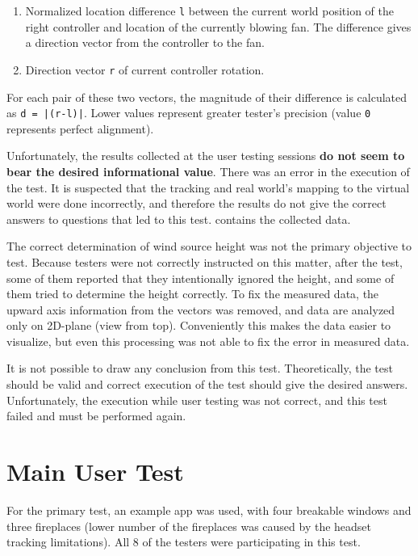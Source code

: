 \begin{enumerate}

\item{Normalized location difference \texttt{l} between the current world position of the right
controller and location of the currently blowing fan. The difference gives a direction
vector from the controller to the fan.}

\item{Direction vector \texttt{r} of current controller rotation.}

\end{enumerate}


For each pair of these two vectors, the magnitude of their difference is calculated
as \texttt{d = |(r-l)|}.
Lower values represent greater tester’s precision (value \texttt{0} represents
perfect alignment).



Unfortunately, the results collected at the user testing sessions
\textbf{do not seem to bear the desired informational value}.
There was an error in the execution of the test. It is suspected that
the tracking and real world’s mapping to the virtual world were done
incorrectly, and therefore the results do not give the correct answers to
questions that led to this test. \hyperlink{15-attachments#att2}{}
contains the collected data.


The correct determination of wind source height was not the primary
objective to test. Because testers were not correctly instructed on this matter,
after the test, some of them reported that they intentionally ignored the
height, and some of them tried to determine the height correctly.
To fix the measured data, the upward axis information from the vectors was
removed, and data are analyzed only on 2D-plane (view from top).
Conveniently this makes the data easier to visualize, but even this
processing was not able to fix the error in measured data.


It is not possible to draw any conclusion from this test. Theoretically, the
test should be valid and correct execution of the test should give the
desired answers. Unfortunately, the execution while user testing was not
correct, and this test failed and must be performed again.


\hypertarget{x-main-user-test}{\section{Main User Test}}
For the primary test, an example app was used, with four breakable windows
and three fireplaces (lower number of the fireplaces was caused by
the headset tracking limitations). All 8 of the testers were participating
in this test.


